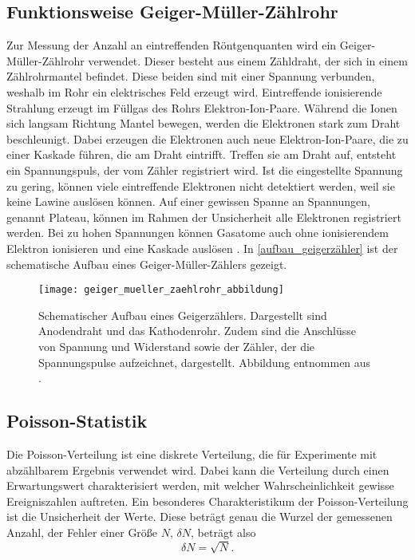 \subsection{Funktionsweise Geiger-Müller-Zählrohr}
Zur Messung der Anzahl an eintreffenden Röntgenquanten wird ein Geiger-Müller-Zählrohr verwendet. Dieser besteht aus einem Zähldraht, der sich in einem Zählrohrmantel befindet. Diese beiden sind mit einer Spannung verbunden, weshalb im Rohr ein elektrisches Feld erzeugt wird. Eintreffende ionisierende Strahlung erzeugt im Füllgas des Rohrs Elektron-Ion-Paare. Während die Ionen sich langsam Richtung Mantel bewegen, werden die Elektronen stark zum Draht beschleunigt. Dabei erzeugen die Elektronen auch neue Elektron-Ion-Paare, die zu einer Kaskade führen, die am Draht eintrifft. Treffen sie am Draht auf, entsteht ein Spannungspuls, der vom Zähler registriert wird. Ist die eingestellte Spannung zu gering, können viele eintreffende Elektronen nicht detektiert werden, weil sie keine Lawine auslösen können. Auf einer gewissen Spanne an Spannungen, genannt Plateau, können im Rahmen der Unsicherheit alle Elektronen registriert werden. Bei zu hohen Spannungen können Gasatome auch ohne ionisierendem Elektron ionisieren und eine Kaskade auslösen \cite{geigerzähler}. 
In \autoref{aufbau_geigerzähler} ist der schematische Aufbau eines Geiger-Müller-Zählers gezeigt. 
\begin{figure}[H]
	\centering
	\texttt{[image: geiger\_mueller\_zaehlrohr\_abbildung]}
	\caption{Schematischer Aufbau eines Geigerzählers. Dargestellt sind Anodendraht und das Kathodenrohr. Zudem sind die Anschlüsse von Spannung und Widerstand sowie der Zähler, der die Spannungspulse aufzeichnet, dargestellt. Abbildung entnommen aus \cite{geigerzähler_bildl}. }
	\label{aufbau_geigerzähler}
\end{figure}



\subsection{Poisson-Statistik}
Die Poisson-Verteilung ist eine diskrete Verteilung, die für Experimente mit abzählbarem Ergebnis verwendet wird. Dabei kann die Verteilung durch einen Erwartungswert charakterisiert werden, mit welcher Wahrscheinlichkeit gewisse Ereigniszahlen auftreten. Ein besonderes Charakteristikum der Poisson-Verteilung ist die Unsicherheit der Werte. Diese beträgt genau die Wurzel der gemessenen Anzahl, der Fehler einer Größe $N$, $\delta N$, beträgt also 
$$\delta N=\sqrt{N}. $$










